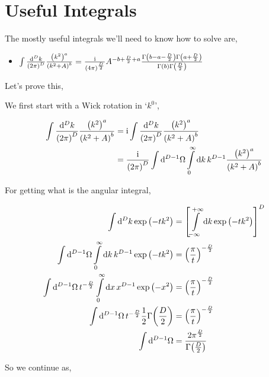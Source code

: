 \section{Useful Integrals}

The mostly useful integrals we'll need to know how to solve are,

\begin{itemize}
    \item $\int\frac{\dd[D]{k}}{\qty(2\pi)^D}\frac{\qty(k^2)^a}{\qty(k^2+A)^b}=\frac{\textnormal{i}}{\qty(4\pi)^{\frac D2}}A^{-b+\frac D2+a}\frac{\Gamma\qty(b-a-\frac D2)\Gamma\qty(a+\frac D2)}{\Gamma\qty(b)\Gamma\qty(\frac D2)}$
\end{itemize}

Let's prove this,

We first start with a Wick rotation in `$k^0$',

\begin{align}
    \int\frac{\dd[D]{k}}{\qty(2\pi)^D}\frac{\qty(k^2)^a}{\qty(k^2+A)^b}&=\textnormal{i}\int\frac{\dd[D]{k}}{\qty(2\pi)^D}\frac{\qty(k^2)^a}{\qty(k^2+A)^b}\nonumber\\
    &=\frac{\textnormal{i}}{\qty(2\pi)^D}\int\dd[D-1]{\Omega}\int\limits_0^\infty\dd{k}{k^{D-1}}\frac{\qty(k^2)^a}{\qty(k^2+A)^b}\nonumber
\end{align}

For getting what is the angular integral,

\begin{align}
    \int\dd[D]{k}\exp\qty(-tk^2)&=\qty[\int\limits_{-\infty}^{+\infty}\dd{k}\exp\qty(-tk^2)]^D\nonumber\\
    \int\dd[D-1]{\Omega}\int\limits_0^{\infty}\dd{k}k^{D-1}\exp\qty(-tk^2)&=\qty(\frac{\pi}{t})^{-\frac D2}\nonumber\\
    \int\dd[D-1]{\Omega}t^{-\frac D2}\int\limits_0^{\infty}\dd{x}x^{D-1}\exp\qty(-x^2)&=\qty(\frac{\pi}{t})^{-\frac D2}\nonumber\\
    \int\dd[D-1]{\Omega}t^{-\frac D2}\frac12\Gamma\qty(\frac D2)&=\qty(\frac{\pi}{t})^{-\frac D2}\nonumber\\
    \int\dd[D-1]{\Omega}&=\frac{2\pi^{\frac D2}}{\Gamma\qty(\frac D2)}\nonumber
\end{align}

So we continue as,

